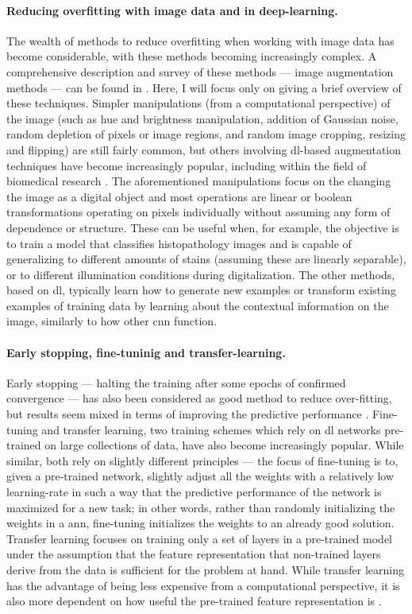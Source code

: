 \paragraph{Reducing overfitting with image data and in deep-learning.} The wealth of methods to reduce overfitting when working with image data has become considerable, with these methods becoming increasingly complex. A comprehensive description and survey of these methods --- image augmentation methods --- can be found in \cite{Shorten2019-hr}. Here, I will focus only on giving a brief overview of these techniques. Simpler manipulations (from a computational perspective) of the image (such as hue and brightness manipulation, addition of Gaussian noise, random depletion of pixels or image regions, and random image cropping, resizing and flipping) are still fairly common, but others involving \ac{dl}-based augmentation techniques have become increasingly popular, including within the field of biomedical research \cite{Shorten2019-hr}. The aforementioned manipulations focus on the changing the image as a digital object and most operations are linear or boolean transformations operating on pixels individually without assuming any form of dependence or structure. These can be useful when, for example, the objective is to train a model that classifies histopathology images and is capable of generalizing to different amounts of stains (assuming these are linearly separable), or to different illumination conditions during digitalization. The other methods, based on \ac{dl}, typically learn how to generate new examples or transform existing examples of training data by learning about the contextual information on the image, similarly to how other \ac{cnn} function.

\paragraph{Early stopping, fine-tuninig and transfer-learning.} Early stopping --- halting the training after some epochs of confirmed convergence --- has also been considered as good method to reduce over-fitting, but results seem mixed in terms of improving the predictive performance \cite{Prechelt2012-xf}. Fine-tuning and transfer learning, two training schemes which rely on \ac{dl} networks pre-trained on large collections of data, have also become increasingly popular. While similar, both rely on slightly different principles --- the focus of fine-tuning is to, given a pre-trained network, slightly adjust all the weights with a relatively low learning-rate in such a way that the predictive performance of the network is maximized for a new task; in other words, rather than randomly initializing the weights in a \ac{ann}, fine-tuning initializes the weights to an already good solution. Transfer learning focuses on training only a set of layers in a pre-trained model under the assumption that the feature representation that non-trained layers derive from the data is sufficient for the problem at hand. While transfer learning has the advantage of being less expensive from a computational perspective, it is also more dependent on how useful the pre-trained feature representation is \cite{transfer-learning-fine-tuning}. 

